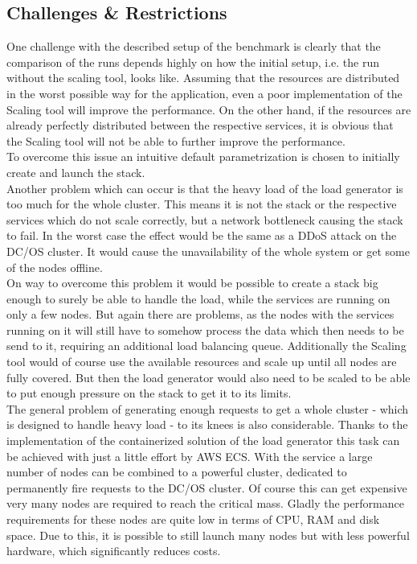 \subsection{Challenges \& Restrictions}
One challenge with the described setup of the benchmark is clearly that the comparison of the runs depends highly on how the initial setup, i.e. the run without the scaling tool, looks like.
Assuming that the resources are distributed in the worst possible way for the application, even a poor implementation of the Scaling tool will improve the performance.
On the other hand, if the resources are already perfectly distributed between the respective services, it is obvious that the Scaling tool will not be able to further improve the performance.\\
To overcome this issue an intuitive default parametrization is chosen to initially create and launch the stack.\\

Another problem which can occur is that the heavy load of the load generator is too much for the whole cluster.
This means it is not the stack or the respective services which do not scale correctly, but a network bottleneck causing the stack to fail.
In the worst case the effect would be the same as a DDoS attack on the DC/OS cluster.
It would cause the unavailability of the whole system or get some of the nodes offline.\\
On way to overcome this problem it would be possible to create a stack big enough to surely be able to handle the load, while the services are running on only a few nodes.
But again there are problems, as the nodes with the services running on it will still have to somehow process the data which then needs to be send to it, requiring an additional load balancing queue.
Additionally the Scaling tool would of course use the available resources and scale up until all nodes are fully covered.
But then the load generator would also need to be scaled to be able to put enough pressure on the stack to get it to its limits.\\

The general problem of generating enough requests to get a whole cluster - which is designed to handle heavy load - to its knees is also considerable.
Thanks to the implementation of the containerized solution of the load generator this task can be achieved with just a little effort by AWS ECS.
With the service a large number of nodes can be combined to a powerful cluster, dedicated to permanently fire requests to the DC/OS cluster.
Of course this can get expensive very many nodes are required to reach the critical mass.
Gladly the performance requirements for these nodes are quite low in terms of CPU, RAM and disk space.
Due to this, it is possible to still launch many nodes but with less powerful hardware, which significantly reduces costs.

